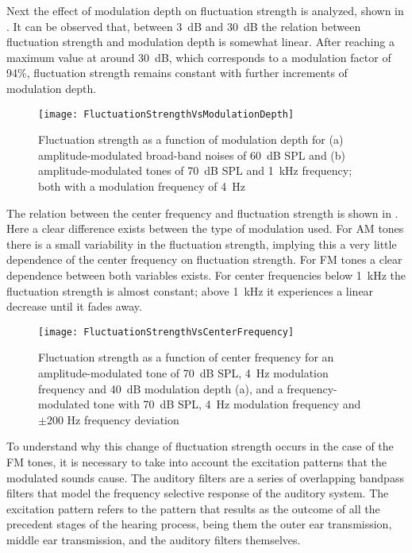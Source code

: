 \documentclass[../main.tex]{subfiles}
\begin{document}
\begin{theoreticalbackground}
Next the effect of modulation depth on fluctuation strength is analyzed, shown
in . It can be observed that, between 3~dB and 30~dB
the relation between fluctuation strength and modulation depth is somewhat
linear. After reaching a maximum value at around 30~dB, which corresponds to a
modulation factor of 94\%, fluctuation strength remains constant with further
increments of modulation depth.

\begin{figure}[!ht]
  \centering
  \texttt{[image: FluctuationStrengthVsModulationDepth]}
  \caption{Fluctuation strength as a function of modulation depth for (a)
    amplitude-modulated broad-band noises of 60~dB SPL and (b)
    amplitude-modulated tones of 70~dB SPL and 1~kHz frequency; both with a
    modulation frequency of 4~Hz~\cite[pp.~249]{Fastl2007Psychoacoustics}}
\label{fig:flucstrenvsmoddep}
\end{figure}

The relation between the center frequency and fluctuation strength is shown in
. Here a clear difference exists between the type of
modulation used. For \gls{AM} tones there is a small variability in the
fluctuation strength, implying this a very little dependence of the center
frequency on fluctuation strength. For \gls{FM} tones a clear dependence between
both variables exists. For center frequencies below 1~kHz the fluctuation
strength is almost constant; above 1~kHz it experiences a linear decrease until
it fades away.

\begin{figure}[!ht]
  \centering
  \texttt{[image: FluctuationStrengthVsCenterFrequency]}
  \caption{Fluctuation strength as a function of center frequency for an
    amplitude-modulated tone of 70~dB SPL, 4~Hz modulation frequency and 40~dB
    modulation depth (a), and a frequency-modulated tone with 70~dB SPL, 4~Hz
    modulation frequency and $\pm200$ Hz frequency
    deviation~\cite[pp. 250]{Fastl2007Psychoacoustics}}
\label{fig:flucstrenvscfreq}
\end{figure}

To understand why this change of fluctuation strength occurs in the case of the
\gls{FM} tones, it is necessary to take into account the excitation patterns
that the modulated sounds cause. The auditory filters are a series of
overlapping bandpass filters that model the frequency selective response of the
auditory system. The excitation pattern refers to the pattern that results as
the outcome of all the precedent stages of the hearing process, being them the
outer ear transmission, middle ear transmission, and the auditory filters
themselves.


\end{theoreticalbackground}
\end{document}
